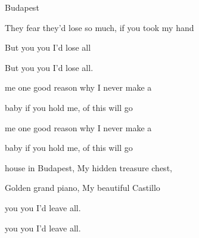 \begin{SBSong}{Budapest}
\begin{SBVerse}
     They fear they'd lose so much, if you took my hand
     
     But  you you I'd lose  all
     
     But  you you I'd lose  all.
  \end{SBVerse} 
  \CBPageBrk
  \begin{SBChorus}  
      me one good reason why I  never make a 
     
      baby if you hold me,  of this will go 
     
      me one good reason why I  never make a 
     
      baby if you hold me,  of this will go 
  \end{SBChorus}   
  \begin{SBVerse}
      house in Budapest, My hidden treasure chest,
     
     Golden grand piano, My beautiful Castillo
     
      you you I'd leave  all.
     
      you you I'd leave  all.
  \end{SBVerse}
\end{SBSong}  
